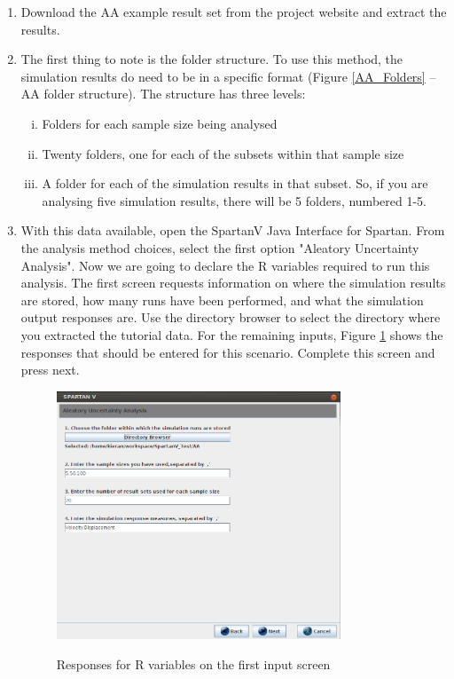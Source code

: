 \documentclass[a4paper,11pt]{article}
\begin{document}
\begin{enumerate}
\item Download the AA example result set from the project website and extract the results.
\item The first thing to note is the folder structure.  To use this method, the simulation results do need to be in a specific format (Figure \ref{AA_Folders} – AA folder structure).  The structure has three levels:
\begin{enumerate}[(i)]
\item Folders for each sample size being analysed
\item Twenty folders, one for each of the subsets within that sample size
\item A folder for each of the simulation results in that subset.  So, if you are analysing five simulation results, there will be 5 folders, numbered 1-5. 
\end{enumerate}
\item With this data available, open the SpartanV Java Interface for Spartan. From the analysis method choices, select the first option "Aleatory Uncertainty Analysis". Now we are going to declare the R variables required to run this analysis. The first screen requests information on where the simulation results are stored, how many runs have been performed, and what the simulation output responses are. Use the directory browser to select the directory where you extracted the tutorial data. For the remaining inputs, Figure \ref{AA_Screen1} shows the responses that should be entered for this scenario. Complete this screen and press next.

\begin{figure}
\centering
    \includegraphics[width=0.8\textwidth]{SpartanV_AA1.png}\\ \noindent
    \caption{Responses for R variables on the first input screen}
    \label{AA_Screen1}
    \newpage 
\end{figure}


\end{enumerate}
\end{document}
